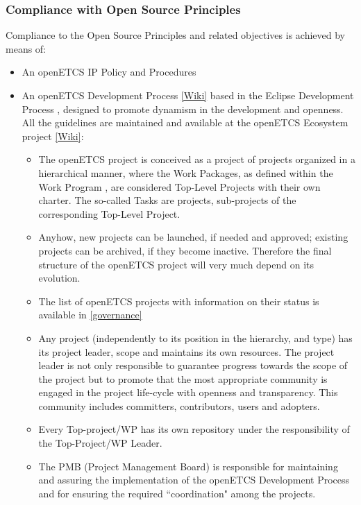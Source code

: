\documentclass{template/openetcs_article}
\begin{document}
\subsubsection{Compliance with Open Source Principles}
Compliance to the Open Source Principles and related objectives is achieved by means of:
\begin{itemize}
\item An openETCS \gls{IP} Policy and Procedures \citep{IPP}
\item An openETCS Development Process \citep{odp} \href{https://github.com/openETCS/ecosystem/wiki/openETCS-Development-Process}{[Wiki]} based in the Eclipse Development Process \citep{EDP}, designed to promote dynamism in the development and openness. All the guidelines are maintained and available at the openETCS Ecosystem project \href{https://github.com/openETCS/ecosystem/wiki/_pages}{[Wiki]}: 
\begin{itemize}
\item The openETCS project is conceived as a project of projects organized in a hierarchical manner, where the Work Packages, as defined within the Work Program \citep{fpp}, are considered Top-Level Projects with their own charter. The so-called Tasks are projects, sub-projects of the corresponding Top-Level Project.
\item Anyhow, new projects can be launched, if needed and approved; existing projects can be archived, if they become inactive. Therefore the final structure of the openETCS project will very much depend on its evolution.  
\item The list of openETCS projects with information on their status is available in \href{https://github.com/openETCS/governance/wiki/State-of-Deliverables}{[governance]}
\item Any project (independently to its position in the hierarchy, and type) has its project leader, scope and maintains its own resources. The project leader is not only responsible to guarantee progress towards the scope of the project but to promote that the most appropriate community is engaged in the project life-cycle with openness and transparency. This community includes committers, contributors, users and adopters.
\item Every Top-project/\gls{WP} has its own repository under the responsibility of the Top-Project/\gls{WP} Leader.  
\item The PMB (Project Management Board) is responsible for maintaining and assuring the implementation of the openETCS Development Process and for ensuring the required “coordination" among the projects.

\end{itemize}
\end{itemize}
\end{document}
